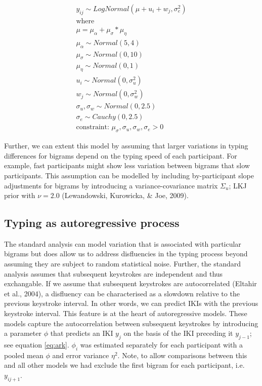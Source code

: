 \documentclass[english,jou,floatsintext]{apa7}
\begin{document}
\[
\tag{1}
\begin{aligned}
y_{ij} \sim LogNormal(\mu + u_i + w_j, \sigma_e^2)\\
\text{where}\\
\mu = \mu_{\alpha} + \mu_{\sigma} * \mu_{\eta}\\
\mu_{\alpha} \sim Normal(5,4)\\
\mu_{\sigma} \sim Normal(0,10)\\
\mu_{\eta} \sim Normal(0,1)\\
u_i \sim Normal(0, \sigma_u^2)\\
w_j \sim Normal(0, \sigma_w^2)\\
\sigma_u, \sigma_w \sim Normal(0,2.5)\\
\sigma_e \sim Cauchy(0,2.5)\\
\text{constraint: }\mu_{\sigma}, \sigma_u, \sigma_w, \sigma_e >0 
\end{aligned}
\label{eq:lmm}
\]

Further, we can extent this model by assuming that larger variations in typing differences for bigrams depend on the typing speed of each participant. For example, fast participants might show less variation between bigrams that slow participants. This assumption can be modelled by including by-participant slope adjustments for bigrams by introducing a variance-covariance matrix \(\Sigma_u\); LKJ prior with \(\nu=2.0\) (Lewandowski, Kurowicka, \& Joe, 2009).

\hypertarget{typing-as-autoregressive-process}{%
\subsection{Typing as autoregressive process}\label{typing-as-autoregressive-process}}

The standard analysis can model variation that is associated with particular bigrams but does allow us to address disfluencies in the typing process beyond assuming they are subject to random statistical noise. Further, the standard analysis assumes that subsequent keystrokes are independent and thus exchangable. If we assume that subsequent keystrokes are autocorrelated (Eltahir et al., 2004), a disfluency can be characterised as a slowdown relative to the previous keystroke interval. In other words, we can predict IKIs with the previous keystroke interval. This feature is at the heart of autoregressive models. These models capture the autocorrelation between subsequent keystrokes by introducing a parameter \(\phi\) that predicts an IKI \(y_j\) on the basis of the IKI preceding it \(y_{j-1}\); see equation \ref{eq:ark}. \(\phi_i\) was estimated separately for each participant with a pooled mean \(\phi\) and error variance \(\eta^2\). Note, to allow comparisons between this and all other models we had exclude the first bigram for each participant, i.e. \(y_{ij+1}\).
\end{document}
